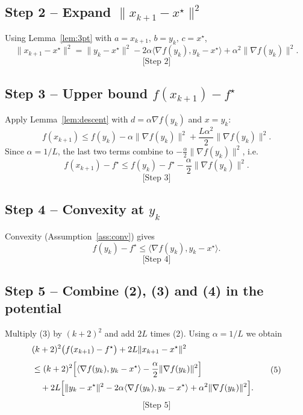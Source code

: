 \documentclass{article}
\begin{document}
\subsection*{Step 2 – Expand $\|x_{k+1}-x^{\star}\|^{2}$}
Using Lemma~\ref{lem:3pt} with $a=x_{k+1},\,b=y_{k},\,c=x^{\star}$,
\[
\|x_{k+1}-x^{\star}\|^{2}
 =\|y_{k}-x^{\star}\|^{2}
   -2\alpha\langle\nabla f(y_{k}),y_{k}-x^{\star}\rangle
   +\alpha^{2}\|\nabla f(y_{k})\|^{2}.
\tag{2}
\]
\[
\text{[Step 2]}
\]

\subsection*{Step 3 – Upper bound $f(x_{k+1})-f^{\star}$}
Apply Lemma~\ref{lem:descent} with $d=\alpha\nabla f(y_{k})$ and $x=y_{k}$:
\[
f(x_{k+1})\le f(y_{k})-\alpha\|\nabla f(y_{k})\|^{2}
            +\frac{L\alpha^{2}}{2}\|\nabla f(y_{k})\|^{2}.
\]
Since $\alpha=1/L$, the last two terms combine to $-\frac{\alpha}{2}\|\nabla f(y_{k})\|^{2}$, i.e.
\[
f(x_{k+1})-f^{\star}\le f(y_{k})-f^{\star}
                    -\frac{\alpha}{2}\|\nabla f(y_{k})\|^{2}.
\tag{3}
\]
\[
\text{[Step 3]}
\]

\subsection*{Step 4 – Convexity at $y_{k}$}
Convexity (Assumption~\ref{ass:conv}) gives
\[
f(y_{k})-f^{\star}\le\langle\nabla f(y_{k}),y_{k}-x^{\star}\rangle .
\tag{4}
\]
\[
\text{[Step 4]}
\]

\subsection*{Step 5 – Combine (2), (3) and (4) in the potential}
Multiply (3) by $(k+2)^{2}$ and add $2L$ times (2). Using $\alpha=1/L$ we obtain
\[
\begin{aligned}
&(k+2)^{2}\bigl(f(x_{k+1})-f^{\star}\bigr)
   +2L\|x_{k+1}-x^{\star}\|^{2}\\[4pt]
&\le (k+2)^{2}\Bigl[\langle\nabla f(y_{k}),y_{k}-x^{\star}\rangle
            -\frac{\alpha}{2}\|\nabla f(y_{k})\|^{2}\Bigr]   \\
&\quad+2L\Bigl[\|y_{k}-x^{\star}\|^{2}
        -2\alpha\langle\nabla f(y_{k}),y_{k}-x^{\star}\rangle
        +\alpha^{2}\|\nabla f(y_{k})\|^{2}\Bigr].
\end{aligned}
\tag{5}
\]
\[
\text{[Step 5]}
\]
\end{document}
